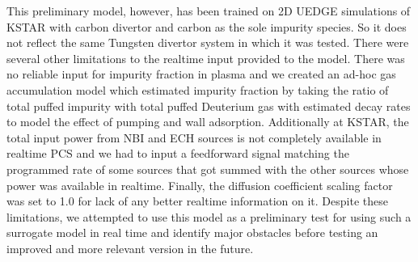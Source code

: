 This preliminary model, however, has been trained on 2D UEDGE simulations of KSTAR with carbon divertor and carbon as the sole impurity species.
So it does not reflect the same Tungsten divertor system in which it was tested.
There were several other limitations to the realtime input provided to the model.
There was no reliable input for impurity fraction in plasma and we created an ad-hoc gas accumulation model which estimated impurity fraction by taking the ratio of total puffed impurity with total puffed Deuterium gas with estimated decay rates to model the effect of pumping and wall adsorption.
Additionally at KSTAR, the total input power from NBI and ECH sources is not completely available in realtime PCS and we had to input a feedforward signal matching the programmed rate of some sources that got summed with the other sources whose power was available in realtime.
Finally, the diffusion coefficient scaling factor was set to 1.0 for lack of any better realtime information on it.
Despite these limitations, we attempted to use this model as a preliminary test for using such a surrogate model in real time and identify major obstacles before testing an improved and more relevant version in the future.
